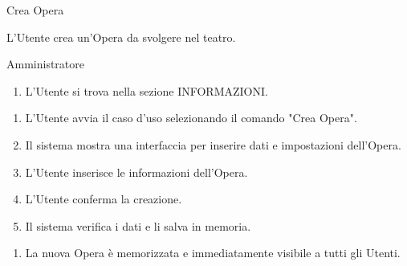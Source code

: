 


\renewcommand{\attori}{Amministratore}

{\ucTable	%
{	%
	Crea Opera
	
}{	%
	
}{	%
	L'Utente crea un'Opera da svolgere nel teatro.
	
}{	%
	\attori
	
}{	%
	\begin{enumerate}
        \item L'Utente si trova nella sezione INFORMAZIONI.
    \end{enumerate}
	
}{	%
	\begin{enumerate}
        \item L'Utente avvia il caso d'uso selezionando il comando "Crea Opera".
        \item Il sistema mostra una interfaccia per inserire dati e impostazioni dell'Opera.
        \item L'Utente inserisce le informazioni dell'Opera.
        \item L'Utente conferma la creazione.
        \item Il sistema verifica i dati e li salva in memoria.
    \end{enumerate}
	
}{	%
	\begin{enumerate}
        \item La nuova Opera è memorizzata e immediatamente visibile a tutti gli Utenti.
    \end{enumerate}
	
}{	%
} }


